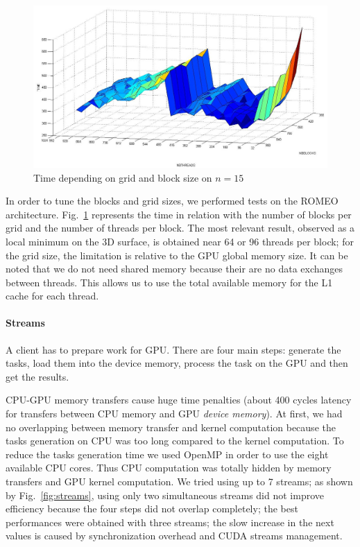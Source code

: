 \begin{figure}[t!]
\centering
\includegraphics[scale=.4]{figures/langford/graphe_15_9}
\caption{Time depending on grid and block size on $n=15$}
\label{f7}
\end{figure}

In order to tune the blocks and grid sizes, we performed tests on the ROMEO architecture. 
Fig.~\ref{f7} represents the time in relation with the number of blocks per grid and the number of threads per block. The most relevant result, observed as a local minimum on the 3D surface, is obtained near 64 or 96 threads per block; for the grid size, the limitation is relative to the GPU global memory size.
It can be noted that we do not need shared memory because their are no data exchanges between threads. This allows us to use the total available memory for the L1 cache for each thread.

\paragraph{Streams}


A client has to prepare work for GPU. There are four main steps: generate the tasks, load them into the device memory, process the task on the GPU and then get the results.

CPU-GPU memory transfers cause huge time penalties (about 400 cycles latency for transfers between CPU memory and GPU \emph{device memory}). 
At first, we had no overlapping between memory transfer and kernel computation because the tasks generation on CPU was too long compared to the kernel computation.
To reduce the tasks generation time we used OpenMP in order to use the eight available CPU cores.
Thus CPU computation was totally hidden by memory transfers and GPU kernel computation. We tried using up to 7 streams; as shown by Fig.~\ref{fig:streams}, using only two simultaneous streams did not improve efficiency because the four steps did not overlap completely; the best performances were obtained with three streams; the slow increase in the next values is caused by synchronization overhead and CUDA streams management.





